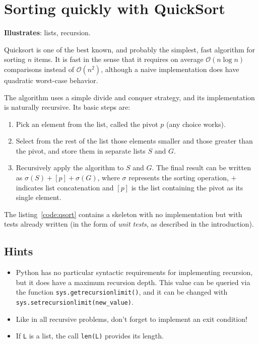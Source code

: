 \section{Sorting quickly with QuickSort }

\textbf{Illustrates}: lists, recursion.

Quicksort is one of the best known, and probably the simplest, fast
algorithm for sorting $n$ items. It is fast in the sense that it
requires on average $\mathcal{O}(n\log n)$ comparisons instead of
$\mathcal{O}(n^{2})$, although a naive implementation does have quadratic
worst-case behavior.

The algorithm uses a simple divide and conquer strategy, and its implementation
is naturally recursive. Its basic steps are:

\begin{enumerate}
\item Pick an element from the list, called the pivot $p$ (any choice works).
\item Select from the rest of the list those elements smaller and those
greater than the pivot, and store them in separate lists $S$ and
$G$.
\item Recursively apply the algorithm \texttt{}to $S$ and $G$. The final
result can be written as $\sigma(S)+[p]+\sigma(G)$, where $\sigma$
represents the sorting operation, $+$ indicates list concatenation
and $[p]$ is the list containing the pivot as its single element.
\end{enumerate}
The listing~\ref{code:qsort} contains a skeleton with no implementation
but with tests already written (in the form of \emph{unit tests},
as described in the introduction).




\subsection*{Hints}

\begin{itemize}

\item Python has no particular syntactic requirements for implementing
  recursion, but it does have a maximum recursion depth. This value can be
  queried via the function \texttt{sys.getrecursionlimit()}, and it can be
  changed with \texttt{sys.setrecursionlimit(new\_value)}.

\item Like in all recursive problems, don't forget to implement an exit
  condition!

\item If \texttt{L} is a list, the call \texttt{len(L)} provides its length.

\end{itemize}

